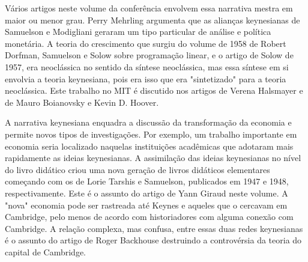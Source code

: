 \documentclass[a4paper,12pt]{article}[abntex2]
\begin{document}
Vários artigos neste volume da conferência envolvem essa narrativa mestra em maior ou menor grau. Perry Mehrling argumenta que as alianças keynesianas de Samuelson e Modigliani geraram um tipo particular de análise e política monetária. A teoria do crescimento que surgiu do volume de 1958 de Robert Dorfman, Samuelson e Solow sobre programação linear, e o artigo de Solow de 1957, era neoclássica no sentido da síntese neoclássica, mas essa síntese em si envolvia a teoria keynesiana, pois era isso que era "sintetizado" para a teoria neoclássica. Este trabalho no MIT é discutido nos artigos de Verena Halsmayer e de Mauro Boianovsky e Kevin D. Hoover.

A narrativa keynesiana enquadra a discussão da transformação da economia e permite novos tipos de investigações. Por exemplo, um trabalho importante em economia seria localizado naquelas instituições acadêmicas que adotaram mais rapidamente as ideias keynesianas. A assimilação das ideias keynesianas no nível do livro didático criou uma nova geração de livros didáticos elementares começando com os de Lorie Tarshis e Samuelson, publicados em 1947 e 1948, respectivamente. Este é o assunto do artigo de Yann Giraud neste volume. A "nova" economia pode ser rastreada até Keynes e aqueles que o cercavam em Cambridge, pelo menos de acordo com historiadores com alguma conexão com Cambridge. A relação complexa, mas confusa, entre essas duas redes keynesianas é o assunto do artigo de Roger Backhouse destruindo a controvérsia da teoria do capital de Cambridge.
\end{document}
